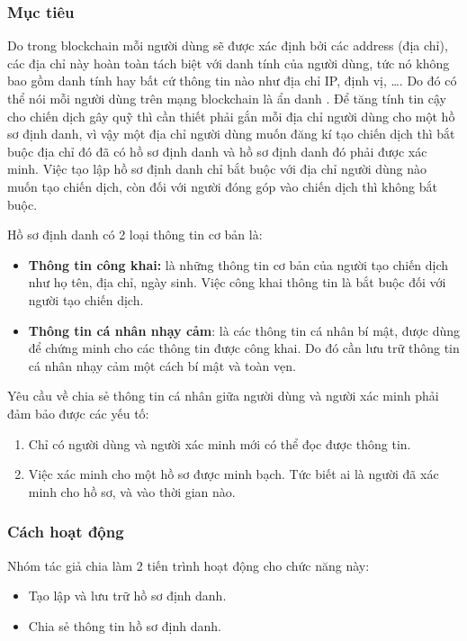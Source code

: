 \documentclass[../main-report.tex]{subfiles}
\begin{document}
\subsubsection{Mục tiêu}
Do trong \gls{blockchain} mỗi người dùng sẽ được xác định bởi các \gls{address} (địa chỉ), các địa chỉ này hoàn toàn tách biệt với danh tính của người dùng, tức nó không bao gồm danh tính hay bất cứ thông tin nào như địa chỉ IP, định vị, \ldots. Do đó có thể nói mỗi người dùng trên mạng \gls{blockchain} là ẩn danh \cite{henry2018blockchain}. Để tăng tính tin cậy cho chiến dịch gây quỹ thì cần thiết phải gắn mỗi địa chỉ người dùng cho một hồ sơ định danh, vì vậy một địa chỉ người dùng muốn đăng kí tạo chiến dịch thì bắt buộc địa chỉ đó đã có hồ sơ định danh và hồ sơ định danh đó phải được xác minh. Việc tạo lập hồ sơ định danh chỉ bắt buộc với địa chỉ người dùng nào muốn tạo chiến dịch, còn đối với người đóng góp vào chiến dịch thì không bắt buộc.

Hồ sơ định danh có 2 loại thông tin cơ bản là: 

\begin{itemize}
\item \textbf{Thông tin công khai:} là những thông tin cơ bản của người tạo chiến dịch như họ tên, địa chỉ, ngày sinh. Việc công khai thông tin là bắt buộc đối với người tạo chiến dịch.
\item \textbf{Thông tin cá nhân nhạy cảm}: là các thông tin cá nhân bí mật, được dùng để chứng minh cho các thông tin được công khai. Do đó cần lưu trữ thông tin cá nhân nhạy cảm một cách bí mật và toàn vẹn.
\end{itemize}

Yêu cầu về chia sẻ thông tin cá nhân giữa người dùng và người xác minh phải đảm bảo được các yếu tố:

\begin{enumerate}
\item Chỉ có người dùng và người xác minh mới có thể đọc được thông tin.
\item Việc xác minh cho một hồ sơ được minh bạch. Tức biết ai là người đã xác minh cho hồ sơ, và vào thời gian nào.
\end{enumerate}

\subsubsection{Cách hoạt động}
Nhóm tác giả chia làm 2 tiến trình hoạt động cho chức năng này:

\begin{itemize}
\item Tạo lập và lưu trữ hồ sơ định danh.
\item Chia sẻ thông tin hồ sơ định danh.
\end{itemize}
\end{document}
